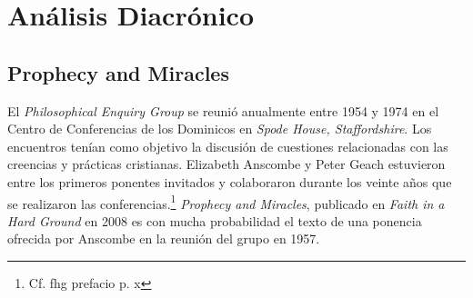\section{Análisis Diacrónico}

\subsection{Prophecy and Miracles}

El \emph{Philosophical Enquiry Group} se reunió anualmente entre 1954 y 1974 en
el Centro de Conferencias de los Dominicos en \emph{Spode House, Staffordshire}.
Los encuentros tenían como objetivo la discusión de cuestiones relacionadas con
las creencias y prácticas cristianas. Elizabeth Anscombe y Peter Geach
estuvieron entre los primeros ponentes invitados y colaboraron durante los
veinte años que se realizaron las conferencias.\footnote{Cf. fhg prefacio p. x}
\emph{Prophecy and Miracles}, publicado en \emph{Faith in a Hard Ground} en 2008
es con mucha probabilidad el texto de una ponencia ofrecida por Anscombe en la
reunión del grupo en 1957.

